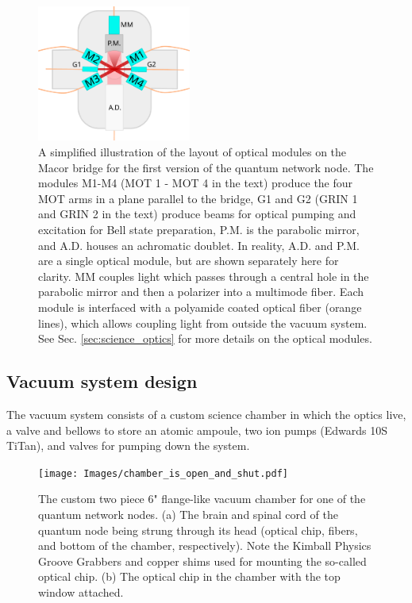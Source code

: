\begin{figure}[!ht]
    \centering
    \includegraphics[width=0.45\textwidth]{Images/optical_chip_schematic.pdf}
    \caption{A simplified illustration of the layout of optical modules on the Macor bridge for the first version of the quantum network node. The modules M1-M4 (MOT 1 - MOT 4 in the text) produce the four MOT arms in a plane parallel to the bridge, G1 and G2 (GRIN 1 and GRIN 2 in the text) produce beams for optical pumping and excitation for Bell state preparation, P.M. is the parabolic mirror, and A.D. houses an achromatic doublet. In reality, A.D. and P.M. are a single optical module, but are shown separately here for clarity. MM couples light which passes through a central hole in the parabolic mirror and then a polarizer into a multimode fiber. Each module is interfaced with a polyamide coated optical fiber (orange lines), which allows coupling  light from outside the vacuum system. See Sec. \ref{sec:science_optics} for more details on the optical modules.}
    \label{fig:optical_chip_design}
\end{figure}

\subsection{Vacuum system design}

The vacuum system consists of a custom science chamber in which the optics live, a valve and bellows to store an atomic ampoule, two ion pumps (Edwards 10S TiTan), and valves for pumping down the system. 
\begin{figure}
    \centering
    \texttt{[image: Images/chamber\_is\_open\_and\_shut.pdf]}
    \caption{The custom two piece 6" flange-like vacuum chamber for one of the quantum network nodes. (a) The brain and spinal cord of the quantum node being strung through its head (optical chip, fibers, and bottom of the chamber, respectively). Note the Kimball Physics Groove Grabbers and copper shims used for mounting the so-called optical chip. (b) The optical chip in the chamber with the top window attached.}
    \label{fig:vacuum_chamber_imgs}
\end{figure}

